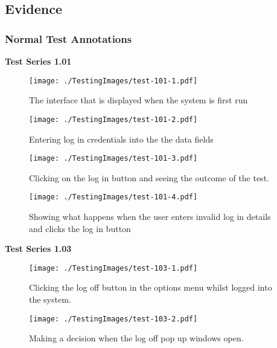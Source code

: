 \pagebreak
        
\subsection{Evidence}

\subsubsection{Normal Test Annotations}

\textbf{Test Series 1.01}

\begin{figure}[H]
    \texttt{[image: ./TestingImages/test-101-1.pdf]}
    \caption{The interface that is displayed when the system is first run} \label{fig:test-101-1}
\end{figure}

\begin{figure}[H]
    \texttt{[image: ./TestingImages/test-101-2.pdf]}
    \caption{Entering log in credentials into the the data fields} \label{fig:test-101-2}
\end{figure}

\begin{figure}[H]
    \texttt{[image: ./TestingImages/test-101-3.pdf]}
    \caption{Clicking on the log in button and seeing the outcome of the test.} \label{fig:test-101-3}
\end{figure}

\begin{figure}[H]
    \texttt{[image: ./TestingImages/test-101-4.pdf]}
    \caption{Showing what happens when the user enters invalid log in details and clicks the log in button} \label{fig:test-101-4}
\end{figure}


\textbf{Test Series 1.03}

\begin{figure}[H]
    \texttt{[image: ./TestingImages/test-103-1.pdf]}
    \caption{Clicking the log off button in the options menu whilst logged into the system.} \label{fig:test-103-1}
\end{figure}

\begin{figure}[H]
    \texttt{[image: ./TestingImages/test-103-2.pdf]}
    \caption{Making a decision when the log off pop up windows open.} \label{fig:test-103-2}
\end{figure}


